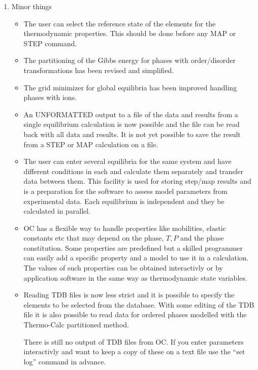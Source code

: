 \documentclass[12pt]{article}
\begin{document}
\begin{enumerate}
\item Minor things
\begin{itemize}
\item The user can select the reference state of the elements for the
  thermodynamic properties.  This should be done before any MAP or
  STEP command.

\item The partitioning of the Gibbs energy for phases with
  order/disorder transformations has been revised and simplified.

\item The grid minimizer for global equilibria has been improved
  handling phases with ions.

\item An UNFORMATTED output to a file of the data and results from a
  single equilibrium calculation is now possible and the file can be
  read back with all data and results.  It is not yet possible to save
  the result from a STEP or MAP calculation on a file.

\item The user can enter several equilibria for the same system and
  have different conditions in each and calculate them separately and
  transfer data between them.  This facility is used for storing
  step/map results and is a preparation for the software to assess
  model parameters from experimental data.  Each equilibrium is
  independent and they be calculated in parallel.

\item OC has a flexible way to handle properties like mobilities,
  elastic constants etc that may depend on the phase, $T, P$ and the
  phase constitution.  Some properties are predefined but a skilled
  programmer can easily add a specific property and a model to use it
  in a calculation.  The values of such properties can be obtained
  interactivly or by application software in the same way as
  thermodynamic state variables.

\item Reading TDB files is now less strict and it is possible to
  specify the elements to be selected from the database.  With some
  editing of the TDB file it is also possible to read data for ordered
  phases modelled with the Thermo-Calc partitioned method.

  There is still no output of TDB files from OC.  If you enter
  parameters interactivly and want to keep a copy of these on a text
  file use the ``set log'' command in advance.


\end{itemize}
\end{enumerate}
\end{document}
